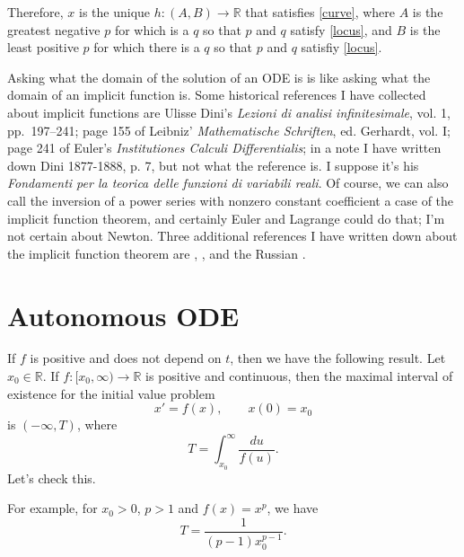 \documentclass{article}
\begin{document}
Therefore, $x$ is the unique $h:(A,B) \to \mathbb{R}$ that satisfies  \eqref{curve}, where $A$ is the greatest negative $p$ for which is a $q$ so that $p$ and $q$ satisfy \eqref{locus},
and  $B$ is the least positive $p$ for which there is a $q$ so that $p$ and $q$ satisfiy \eqref{locus}.

Asking what the domain of the solution of an ODE is is like asking what the domain of an implicit function is. Some historical references
I have collected about implicit functions are Ulisse Dini's {\em Lezioni di analisi infinitesimale}, vol. 1, pp.~197--241;
page 155 of Leibniz'  {\em Mathematische Schriften}, ed. Gerhardt, vol. I;
page 241 of Euler's {\em Institutiones Calculi Differentialis}; in a note I have written down Dini 1877-1888, p. 7, but not what the reference is.
I suppose it's his {\em Fondamenti per la teorica delle funzioni di variabili reali}. Of course, we can also call the inversion of a power series
with nonzero constant coefficient a case of the implicit function theorem, and certainly Euler and Lagrange could do that; I'm not certain about Newton.
Three additional references I have written down about the implicit function theorem are \cite{MR0226976}, 
\cite{MR762062}, and the Russian \cite{MR1046939}.

\section{Autonomous ODE}
If $f$ is positive and does not depend on $t$, then we have the following result. Let
$x_0 \in \mathbb{R}$. If $f:[x_0,\infty) \to \mathbb{R}$ is positive and continuous, then the maximal interval of existence for the initial
value problem
\[
x'=f(x), \qquad x(0)=x_0
\]
is $(-\infty,T)$, where
\[
T=\int_{x_0}^\infty \frac{du}{f(u)}.
\]
Let's check this. 

For example, for $x_0>0$, $p>1$ and $f(x)=x^p$, we have 
\[
T=\frac{1}{(p-1)x_0^{p-1}}.
\]




\end{document}
